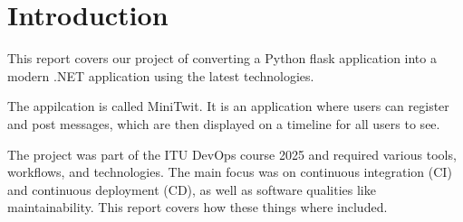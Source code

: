 \section{Introduction}
\label{ch:introduction}

This report covers our project of converting a Python flask application 
into a modern .NET application using the latest technologies.

The appilcation is called MiniTwit. 
It is an application where users can register and post messages, 
which are then displayed on a timeline for all users to see.

The project was part of the ITU DevOps course 2025 and 
required various tools, workflows, and technologies. 
The main focus was on continuous integration (CI) 
and continuous deployment (CD), as well as 
software qualities like maintainability.
This report covers how these things where included.
